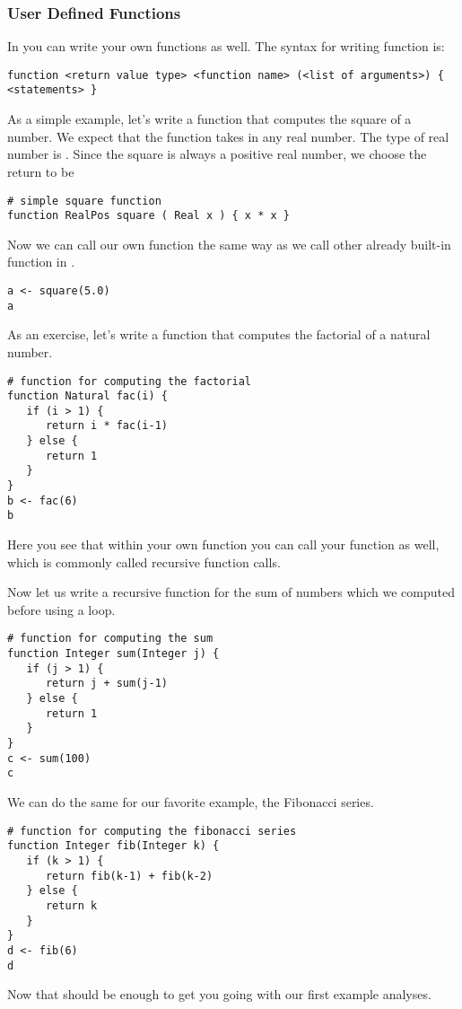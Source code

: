 \subsubsection{User Defined Functions}
In \Rev you can write your own functions as well.
The syntax for writing function is:
{\tt \begin{snugshade*}
\begin{lstlisting}    
function <return value type> <function name> (<list of arguments>) { <statements> }
\end{lstlisting}
\end{snugshade*}}
As a simple example, let's write a function that computes the square of a number.
We expect that the function takes in any real number.
The type of real number is .
Since the square is always a positive real number, we choose the return to be 
{\tt \begin{snugshade*}
\begin{lstlisting}    
# simple square function
function RealPos square ( Real x ) { x * x }
\end{lstlisting}
\end{snugshade*}}
Now we can call our own function the same way as we call other already built-in function in \RevBayes.
{\tt \begin{snugshade*}
\begin{lstlisting}    
a <- square(5.0)
a
\end{lstlisting}
\end{snugshade*}}
As an exercise, let's write a function that computes the factorial of a natural number.
{\tt \begin{snugshade*}
\begin{lstlisting}    
# function for computing the factorial
function Natural fac(i) {
   if (i > 1) {
      return i * fac(i-1)
   } else {
      return 1
   }
}
b <- fac(6)
b
\end{lstlisting}
\end{snugshade*}}
Here you see that within your own function you can call your function as well, which is commonly called recursive function calls.

Now let us write a recursive function for the sum of numbers which we computed before using a  loop.
{\tt \begin{snugshade*}
\begin{lstlisting}    
# function for computing the sum
function Integer sum(Integer j) {
   if (j > 1) {
      return j + sum(j-1)
   } else {
      return 1
   }
}
c <- sum(100)
c
\end{lstlisting}
\end{snugshade*}}
We can do the same for our favorite example, the Fibonacci series.
{\tt \begin{snugshade*}
\begin{lstlisting}    
# function for computing the fibonacci series
function Integer fib(Integer k) {
   if (k > 1) {
      return fib(k-1) + fib(k-2)
   } else {
      return k
   }
}
d <- fib(6)
d
\end{lstlisting}
\end{snugshade*}}
Now that should be enough to get you going with our first example analyses.




